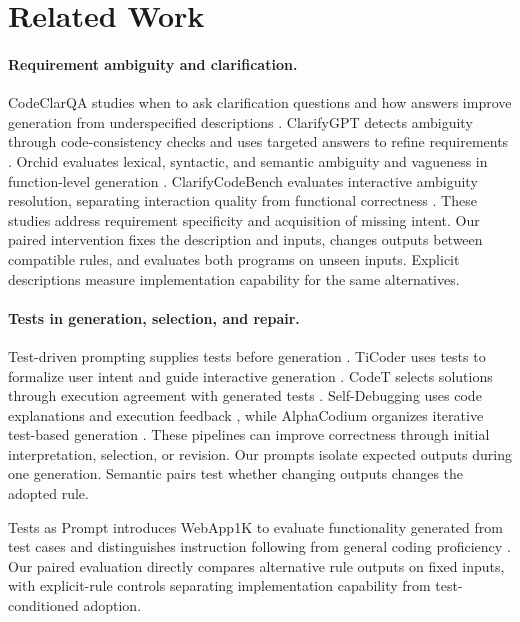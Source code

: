 \documentclass[acmsmall,screen,review,anonymous]{acmart}
\begin{document}
\section{Related Work}

\paragraph{Requirement ambiguity and clarification.}
CodeClarQA studies when to ask clarification questions and how answers improve generation from underspecified descriptions \citep{li2023python}.
ClarifyGPT detects ambiguity through code-consistency checks and uses targeted answers to refine requirements \citep{mu2024clarifygpt}.
Orchid evaluates lexical, syntactic, and semantic ambiguity and vagueness in function-level generation \citep{yang2026assessing}.
ClarifyCodeBench evaluates interactive ambiguity resolution, separating interaction quality from functional correctness \citep{fang2026clarifycodebench}.
These studies address requirement specificity and acquisition of missing intent.
Our paired intervention fixes the description and inputs, changes outputs between compatible rules, and evaluates both programs on unseen inputs.
Explicit descriptions measure implementation capability for the same alternatives.

\paragraph{Tests in generation, selection, and repair.}
Test-driven prompting supplies tests before generation \citep{mathews2024tdd}.
TiCoder uses tests to formalize user intent and guide interactive generation \citep{fakhoury2024ticoder}.
CodeT selects solutions through execution agreement with generated tests \citep{chen2023codet}.
Self-Debugging uses code explanations and execution feedback \citep{chen2024selfdebug}, while AlphaCodium organizes iterative test-based generation \citep{ridnik2024alphacodium}.
These pipelines can improve correctness through initial interpretation, selection, or revision.
Our prompts isolate expected outputs during one generation.
Semantic pairs test whether changing outputs changes the adopted rule.

Tests as Prompt introduces WebApp1K to evaluate functionality generated from test cases and distinguishes instruction following from general coding proficiency \citep{cui2025testsprompttestdrivendevelopmentbenchmark}.
Our paired evaluation directly compares alternative rule outputs on fixed inputs, with explicit-rule controls separating implementation capability from test-conditioned adoption.
\end{document}
